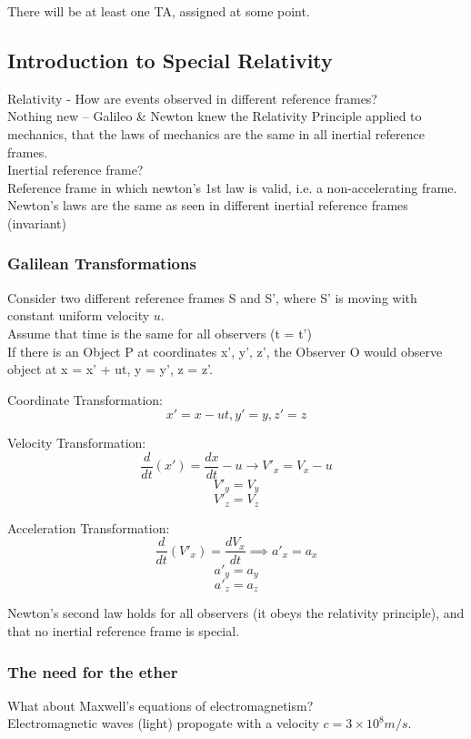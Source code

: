 \documentclass[class=article,crop=false]{standalone}
\begin{document}
There will be at least one TA, assigned at some point. \\

\subsection{Introduction to Special Relativity}
Relativity  - How are events observed in different reference frames? \\
Nothing new -- Galileo \& Newton knew the Relativity Principle applied to mechanics, that the laws of mechanics are the same in all inertial reference frames. \\
Inertial reference frame? \\
Reference frame in which newton's 1st law is valid, i.e. a non-accelerating frame.\\
Newton's laws are the same as seen in different inertial reference frames (invariant) \\

\subsubsection{Galilean Transformations}
Consider two different reference frames S and S', where S' is moving with constant uniform velocity $u$. \\
Assume that time is the same for all observers (t = t') \\

If there is an Object P at coordinates x', y', z', the Observer O would observe object at x = x' + ut, y = y', z = z'. \\
\newpage
\begin{result}
	Coordinate Transformation:
	\[x' = x - ut, y' = y, z' = z\]

	Velocity Transformation: 
	$$ \frac{d}{dt}(x') = \frac{dx}{dt} - u \rightarrow V'_x = V_x - u $$
	$$ V'_y = V_y $$
	$$ V'_z = V_z $$

	Acceleration Transformation:
	$$ \frac{d}{dt}(V'_x) = \frac{dV_x}{dt} \implies a'_x = a_x $$
	$$ a'_y = a_y $$
	$$ a'_z = a_z $$
\end{result}

Newton's second law holds for all observers (it obeys the relativity principle), and that no inertial reference frame is special. \\

\subsubsection{The need for the ether}
What about Maxwell's equations of electromagnetism? \\
Electromagnetic waves (light) propogate with a velocity $ c = 3 \times 10^8 m/s $. \\
\end{document}

